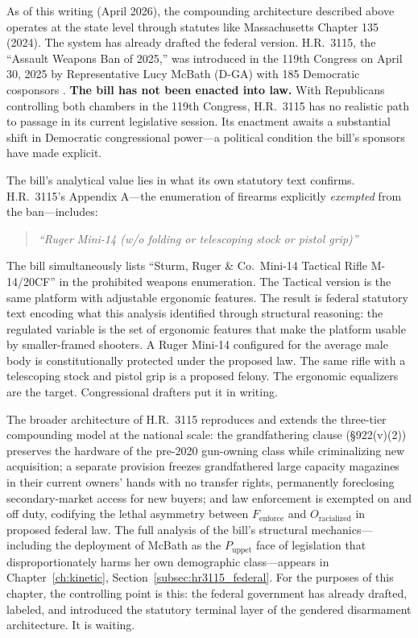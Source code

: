 As of this writing (April 2026), the compounding architecture described above operates at the state level through statutes like Massachusetts Chapter 135 (2024). The system has already drafted the federal version. H.R.\ 3115, the ``Assault Weapons Ban of 2025,'' was introduced in the 119th Congress on April 30, 2025 by Representative Lucy McBath (D-GA) with 185 Democratic cosponsors \cite{hr3115_awb_2025}. \textbf{The bill has not been enacted into law.} With Republicans controlling both chambers in the 119th Congress, H.R.\ 3115 has no realistic path to passage in its current legislative session. Its enactment awaits a substantial shift in Democratic congressional power---a political condition the bill's sponsors have made explicit.

The bill's analytical value lies in what its own statutory text confirms. H.R.\ 3115's Appendix A---the enumeration of firearms explicitly \textit{exempted} from the ban---includes:

\begin{quote}
\textit{``Ruger Mini-14 (w/o folding or telescoping stock or pistol grip)''}
\end{quote}

The bill simultaneously lists ``Sturm, Ruger \& Co.\ Mini-14 Tactical Rifle M-14/20CF'' in the prohibited weapons enumeration. The Tactical version is the same platform with adjustable ergonomic features. The result is federal statutory text encoding what this analysis identified through structural reasoning: the regulated variable is the set of ergonomic features that make the platform usable by smaller-framed shooters. A Ruger Mini-14 configured for the average male body is constitutionally protected under the proposed law. The same rifle with a telescoping stock and pistol grip is a proposed felony. The ergonomic equalizers are the target. Congressional drafters put it in writing.

The broader architecture of H.R.\ 3115 reproduces and extends the three-tier compounding model at the national scale: the grandfathering clause (§922(v)(2)) preserves the hardware of the pre-2020 gun-owning class while criminalizing new acquisition; a separate provision freezes grandfathered large capacity magazines in their current owners' hands with no transfer rights, permanently foreclosing secondary-market access for new buyers; and law enforcement is exempted on and off duty, codifying the lethal asymmetry between $F_{\text{enforce}}$ and $O_{\text{racialized}}$ in proposed federal law. The full analysis of the bill's structural mechanics---including the deployment of McBath as the $P_{\text{uppet}}$ face of legislation that disproportionately harms her own demographic class---appears in Chapter~\ref{ch:kinetic}, Section~\ref{subsec:hr3115_federal}. For the purposes of this chapter, the controlling point is this: the federal government has already drafted, labeled, and introduced the statutory terminal layer of the gendered disarmament architecture. It is waiting.

